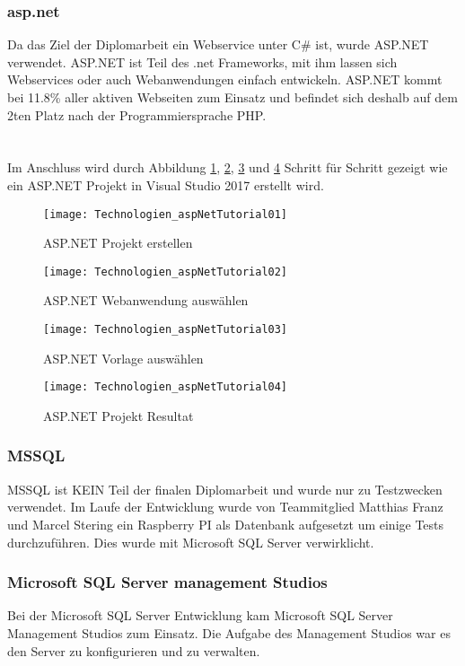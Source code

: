 \subsubsection {asp.net}
\label{sec:asp.net}
Da das Ziel der Diplomarbeit ein Webservice unter C\# ist, wurde ASP.NET verwendet. ASP.NET ist Teil des .net Frameworks, mit ihm lassen sich Webservices oder auch Webanwendungen einfach entwickeln. ASP.NET kommt bei 11.8\% aller aktiven Webseiten zum Einsatz und befindet sich deshalb auf dem 2ten Platz nach der Programmiersprache PHP. \\ \cite{aspnetstatistik} \\
\\ Im Anschluss wird durch Abbildung \ref{fig:aspNetTut01}, \ref{fig:aspNetTut02}, \ref{fig:aspNetTut03} und \ref{fig:aspNetTut04} Schritt für Schritt gezeigt wie ein ASP.NET Projekt in Visual Studio 2017 erstellt wird.
\begin{figure}[h]
    \texttt{[image: Technologien\_aspNetTutorial01]}
    \caption{ASP.NET Projekt erstellen}
    \label{fig:aspNetTut01}
\end{figure}
\begin{figure}[h]
    \texttt{[image: Technologien\_aspNetTutorial02]}
    \caption{ASP.NET Webanwendung auswählen}
    \label{fig:aspNetTut02}
\end{figure}
\begin{figure}[H]
    \texttt{[image: Technologien\_aspNetTutorial03]}
    \caption{ASP.NET Vorlage auswählen}
    \label{fig:aspNetTut03}
\end{figure}
\begin{figure}[h]
    \texttt{[image: Technologien\_aspNetTutorial04]}
    \caption{ASP.NET Projekt Resultat}
    \label{fig:aspNetTut04}
\end{figure}
\subsubsection {MSSQL}
\label{sec:MSSQL}
MSSQL ist KEIN Teil der finalen Diplomarbeit und wurde nur zu Testzwecken verwendet. Im Laufe der Entwicklung wurde von Teammitglied Matthias Franz und Marcel Stering ein Raspberry PI als Datenbank aufgesetzt um einige Tests durchzuführen. Dies wurde mit Microsoft SQL Server verwirklicht. 
\subsubsection {Microsoft SQL Server management Studios}
\label{sec:mssql-server-management-studio}
Bei der Microsoft SQL Server Entwicklung kam Microsoft SQL Server Management Studios zum Einsatz. Die Aufgabe des Management Studios war es den Server zu konfigurieren und zu verwalten. 
